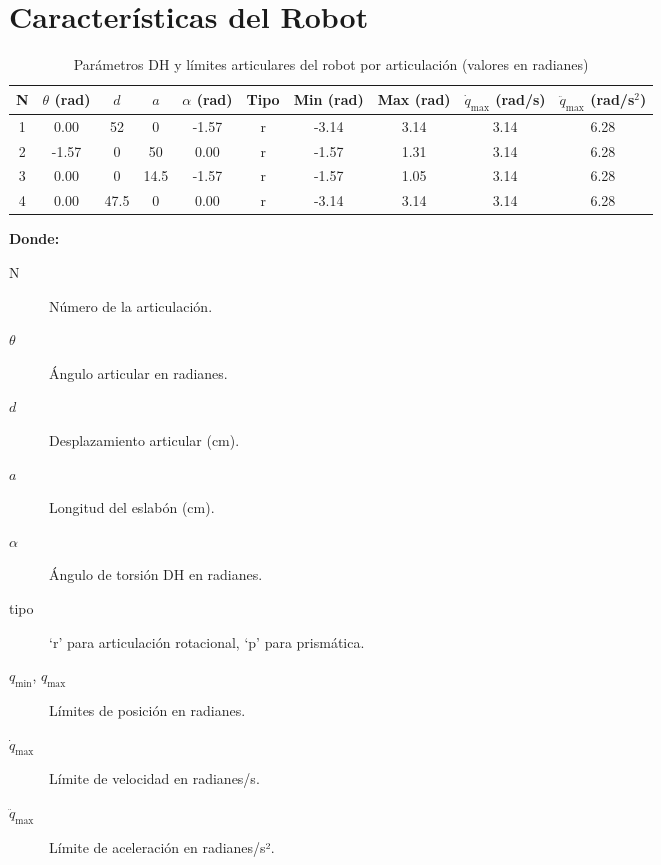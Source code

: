 \section{Características del Robot} \label{sec:caracteristicas_del_robot}

\begin{table}[H]
	\centering
	\begin{tabular}{|c|c|c|c|c|c|c|c|c|c|}
		\hline
		N & $\theta$ (rad) & $d$ & $a$ & $\alpha$ (rad) & Tipo & Min (rad) & Max (rad) & $\dot{q}_{\text{max}}$ (rad/s) & $\ddot{q}_{\text{max}}$ (rad/s$^2$) \\
		\hline
		1 & 0.00  & 52   & 0    & -1.57 & r & -3.14 & 3.14 & 3.14 & 6.28 \\
		2 & -1.57 & 0    & 50   & 0.00  & r & -1.57 & 1.31 & 3.14 & 6.28 \\
		3 & 0.00  & 0    & 14.5 & -1.57 & r & -1.57 & 1.05 & 3.14 & 6.28 \\
		4 & 0.00  & 47.5 & 0    & 0.00  & r & -3.14 & 3.14 & 3.14 & 6.28 \\
		\hline
	\end{tabular}
	\caption{Parámetros DH y límites articulares del robot por articulación (valores en radianes)}
	\label{tab:parametros_dh_articulaciones}
\end{table}

\bigskip
\noindent
\textbf{Donde:}
\begin{description}
	\item[N] Número de la articulación.
	\item[\(\theta\)] Ángulo articular en radianes.
	\item[\(d\)] Desplazamiento articular (cm).
	\item[\(a\)] Longitud del eslabón (cm).
	\item[\(\alpha\)] Ángulo de torsión DH en radianes.
	\item[tipo] ‘r’ para articulación rotacional, ‘p’ para prismática.
	\item[\(q_{\min}\), \(q_{\max}\)] Límites de posición en radianes.
	\item[\(\dot q_{\max}\)] Límite de velocidad en radianes/s.
	\item[\(\ddot q_{\max}\)] Límite de aceleración en radianes/s².

\end{description}

